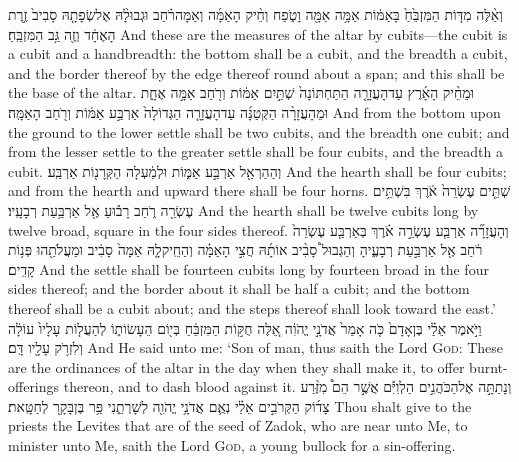 {וְאֵ֨לֶּה מִדּ֤וֹת הַמִּזְבֵּ֙חַ֙ בָּאַמּ֔וֹת אַמָּ֥ה אַמָּ֖ה וָטֹ֑פַח וְחֵ֨יק הָאַמָּ֜ה וְאַמָּה\maqqaf רֹ֗חַב וּגְבוּלָ֨הּ אֶל\maqqaf שְׂפָתָ֤הּ סָבִיב֙ זֶ֣רֶת הָאֶחָ֔ד וְזֶ֖ה גַּ֥ב הַמִּזְבֵּֽחַ׃}
{And these are the measures of the altar by cubits—the cubit is a cubit and a handbreadth: the bottom shall be a cubit, and the breadth a cubit, and the border thereof by the edge thereof round about a span; and this shall be the base of the altar.}
{וּמֵחֵ֨יק הָאָ֜רֶץ עַד\maqqaf הָעֲזָרָ֤ה הַתַּחְתּוֹנָה֙ שְׁתַּ֣יִם אַמּ֔וֹת וְרֹ֖חַב אַמָּ֣ה אֶחָ֑ת וּמֵהָעֲזָרָ֨ה הַקְּטַנָּ֜ה עַד\maqqaf הָעֲזָרָ֤ה הַגְּדוֹלָה֙ אַרְבַּ֣ע אַמּ֔וֹת וְרֹ֖חַב הָאַמָּֽה׃}
{And from the bottom upon the ground to the lower settle shall be two cubits, and the breadth one cubit; and from the lesser settle to the greater settle shall be four cubits, and the breadth a cubit.}
{וְהַהַרְאֵ֖ל אַרְבַּ֣ע אַמּ֑וֹת  וּלְמַ֔עְלָה הַקְּרָנ֖וֹת אַרְבַּֽע׃}
{And the hearth shall be four cubits; and from the hearth and upward there shall be four horns.}
{ שְׁתֵּ֤ים עֶשְׂרֵה֙ אֹ֔רֶךְ בִּשְׁתֵּ֥ים עֶשְׂרֵ֖ה רֹ֑חַב רָב֕וּעַ אֶ֖ל אַרְבַּ֥עַת רְבָעָֽיו׃}
{And the hearth shall be twelve cubits long by twelve broad, square in the four sides thereof.}
{וְהָעֲזָרָ֞ה אַרְבַּ֧ע עֶשְׂרֵ֣ה אֹ֗רֶךְ בְּאַרְבַּ֤ע עֶשְׂרֵה֙ רֹ֔חַב אֶ֖ל אַרְבַּ֣עַת רְבָעֶ֑יהָ וְהַגְּבוּל֩ סָבִ֨יב אוֹתָ֜הּ חֲצִ֣י הָאַמָּ֗ה וְהַחֵֽיק\maqqaf לָ֤הּ אַמָּה֙ סָבִ֔יב וּמַעֲלֹתֵ֖הוּ פְּנ֥וֹת קָדִֽים׃}
{And the settle shall be fourteen cubits long by fourteen broad in the four sides thereof; and the border about it shall be half a cubit; and the bottom thereof shall be a cubit about; and the steps thereof shall look toward the east.’}
{וַיֹּ֣אמֶר אֵלַ֗י בֶּן\maqqaf אָדָם֙ כֹּ֤ה אָמַר֙ אֲדֹנָ֣י יֱהֹוִ֔ה אֵ֚לֶּה חֻקּ֣וֹת הַמִּזְבֵּ֔חַ בְּי֖וֹם הֵעָשׂוֹת֑וֹ לְהַעֲל֤וֹת עָלָיו֙ עוֹלָ֔ה וְלִזְרֹ֥ק עָלָ֖יו דָּֽם׃}
{And He said unto me: ‘Son of man, thus saith the Lord \textsc{God}: These are the ordinances of the altar in the day when they shall make it, to offer burnt-offerings thereon, and to dash blood against it.}
{וְנָתַתָּ֣ה אֶל\maqqaf הַכֹּהֲנִ֣ים הַלְוִיִּ֡ם אֲשֶׁ֣ר הֵם֩ מִזֶּ֨רַע צָד֜וֹק הַקְּרֹבִ֣ים אֵלַ֗י נְאֻ֛ם אֲדֹנָ֥י יֱהֹוִ֖ה לְשָׁרְתֵ֑נִי פַּ֥ר בֶּן\maqqaf בָּקָ֖ר לְחַטָּֽאת׃}
{Thou shalt give to the priests the Levites that are of the seed of Zadok, who are near unto Me, to minister unto Me, saith the Lord \textsc{God}, a young bullock for a sin-offering.}

